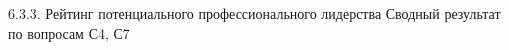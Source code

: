 \begin{frame}{6.3.3. Рейтинг потенциального профессионального лидерства}
\tiny 
Сводный результат по вопросам С4, С7

\fontsize{5pt}{5}\selectfont
\begin{center}
\begin{tabular}{cllc}

\end{tabular}
\end{center}
\end{frame}


